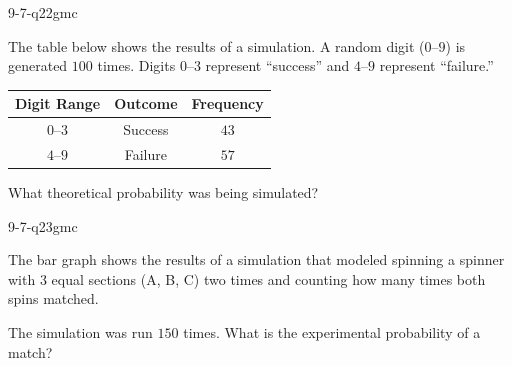 \begin{practiceQuestion}{9-7-q22}{gmc}
\begin{questionText}
The table below shows the results of a simulation. A random digit ($0$--$9$) is generated $100$ times. Digits $0$--$3$ represent ``success'' and $4$--$9$ represent ``failure.''

\begin{center}
\begin{tabular}{|c|c|c|}
\hline
\textbf{Digit Range} & \textbf{Outcome} & \textbf{Frequency} \\
\hline
$0$--$3$ & Success & $43$ \\
\hline
$4$--$9$ & Failure & $57$ \\
\hline
\end{tabular}
\end{center}

What theoretical probability was being simulated?
\end{questionText}
\end{practiceQuestion}

\begin{practiceQuestion}{9-7-q23}{gmc}
\begin{questionText}
The bar graph shows the results of a simulation that modeled spinning a spinner with $3$ equal sections (A, B, C) two times and counting how many times both spins matched.

\begin{center}
\end{center}

The simulation was run $150$ times. What is the experimental probability of a match?
\end{questionText}
\end{practiceQuestion}

